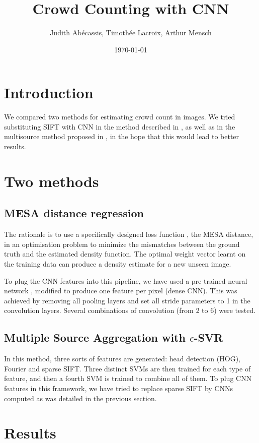 \documentclass[a4paper,11pt, french]{article}
\begin{document}
\title{Crowd Counting with CNN}
\author{Judith Abécassis, Timothée Lacroix, Arthur Mensch} 
\date{\today}
\maketitle
\section*{Introduction}
We compared two methods for estimating crowd count in images. We tried substituting SIFT with CNN in the method described in \cite{basepaper}, as well as in the multisource method proposed in \cite{multisource}, in the hope that this would lead to better results.

\section*{Two methods}
\subsection*{MESA distance regression}
The rationale is to use a specifically designed loss function \cite{basepaper}, the MESA distance,  in an optimisation problem to minimize the mismatches between the ground truth and the estimated density function. The optimal weight vector learnt on the training data can produce a density estimate for a new unseen image.

To plug the CNN features into this pipeline, we have used a pre-trained neural network \cite{overfeat}, modified to produce one feature per pixel (dense CNN). This was achieved by removing all pooling layers and set all stride parameters to 1 in the convolution layers. Several combinations of convolution (from 2 to 6) were tested.

\subsection*{Multiple Source Aggregation with $\epsilon$-SVR}
In this method, three sorts of features are generated: head detection (HOG), Fourier and sparse SIFT. Three distinct SVMs are then trained for each type of feature, and then a fourth SVM is trained to combine all of them. To plug CNN features in this framework, we have tried to replace sparse SIFT by CNNs computed as was detailed in the previous section.

\section*{Results}
\end{document}
